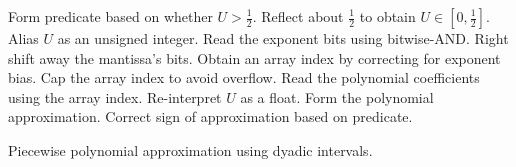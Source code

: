 \documentclass[11pt,a4paper,twoside,english]{extarticle}
\begin{document}
\begin{algorithm}[H]
\DontPrintSemicolon
\KwIn{Floating-point uniform random number $ U \in [0, 1) $.}
Form predicate based on whether $ U > \tfrac{1}{2} $.\;
Reflect about $ \tfrac{1}{2} $ to obtain $ U \in [0, \tfrac{1}{2}] $.\;
Alias $ U $ as an unsigned integer.\;
Read the exponent bits using bitwise-AND.\;
Right shift away the mantissa's bits.\;
Obtain an array index by correcting for exponent bias.\;
Cap the array index to avoid overflow.\;
Read the polynomial coefficients using the array index.\;
Re-interpret $ U $ as a float.\;
Form the polynomial approximation.\;
Correct sign of approximation based on predicate.\;
\caption[Piecewise polynomial approximation using dyadic intervals]{Piecewise polynomial approximation using dyadic intervals.}
\label{algo:piecewise_polynomial_approx_using_dyadic_intervals}
\end{algorithm}
\end{document}
